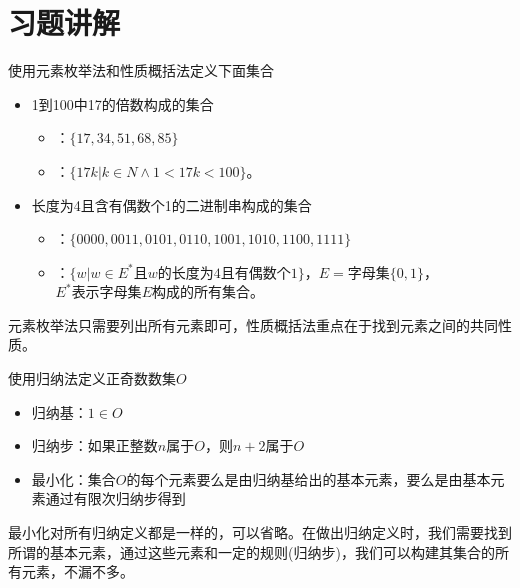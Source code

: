 \documentclass[xetex,10pt,aspectratio=43]{beamer}
\begin{document}
	\section{习题讲解}
	
	\begin{frame}{使用元素枚举法和性质概括法定义下面集合}
		
		\begin{itemize}
			
			\item<1>1到100中17的倍数构成的集合
			
			\begin{itemize}
				
				\item<1>\textcolor{red}{}：$\{17,34,51,68,85\}$
				
				\item<1>\textcolor{red}{}：$\{17k|k\in N\wedge 1<17k<100\}$。
				
			\end{itemize}
			
			
			\item<1>长度为4且含有偶数个1的二进制串构成的集合
			
			\begin{itemize}
				
				\item<1>\textcolor{red}{}：$\{0000,0011,0101,0110,1001,1010,1100,1111\}$
				
				\item<1>\textcolor{red}{}：$\{w|w\in E^{*}\text{且}w\text{的长度为4且有偶数个}1\}$，$E=\text{字母集}\{0,1\}$，$E^{*}\text{表示字母集}E\text{构成的所有集合}$。
				
			\end{itemize}
			
			
		\end{itemize}
	
		\textcolor{mymauve}{元素枚举法只需要列出所有元素即可，性质概括法重点在于找到元素之间的共同性质。}
				
	\end{frame}
	
	\begin{frame}{使用归纳法定义正奇数数集$O$}
		
		\begin{itemize}
			
			\item<1>归纳基：$1\in O$
			
			\item<1>归纳步：如果正整数$n$属于$O$，则$n+2$属于$O$
			
			\item<1>最小化：集合$O$的每个元素要么是由归纳基给出的基本元素，要么是由基本元素通过有限次归纳步得到
			
		\end{itemize}
		
		\textcolor{mymauve}{最小化对所有归纳定义都是一样的，可以省略。在做出归纳定义时，我们需要找到所谓的基本元素，通过这些元素和一定的规则(归纳步)，我们可以构建其集合的所有元素，不漏不多。}
		
	\end{frame}
\end{document}
